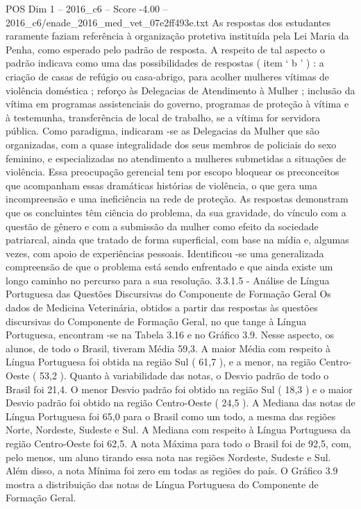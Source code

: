 \begin{textsample}{POS Dim 1 – 2016\_c6 – Score -4.00 – 2016\_c6/enade\_2016\_med\_vet\_07e2ff493e.txt}
As respostas dos estudantes raramente faziam referência à organização protetiva instituída pela Lei Maria da Penha, como esperado pelo padrão de resposta.
A respeito de tal aspecto o padrão indicava como uma das possibilidades de respostas ( item ‘ b ’ ) : a criação de casas de refúgio ou casa-abrigo, para acolher mulheres vítimas de violência doméstica ; reforço às Delegacias de Atendimento à Mulher ; inclusão da vítima em programas assistenciais do governo, programas de proteção à vítima e à testemunha, transferência de local de trabalho, se a vítima for servidora pública.
Como paradigma, indicaram -se as Delegacias da Mulher que são organizadas, com a quase integralidade dos seus membros de policiais do sexo feminino, e especializadas no atendimento a mulheres submetidas a situações de violência.
Essa preocupação gerencial tem por escopo bloquear os preconceitos que acompanham essas dramáticas histórias de violência, o que gera uma incompreensão e uma ineficiência na rede de proteção.
As respostas demonstram que os concluintes têm ciência do problema, da sua gravidade, do vínculo com a questão de gênero e com a submissão da mulher como efeito da sociedade patriarcal, ainda que tratado de forma superficial, com base na mídia e, algumas vezes, com apoio de experiências pessoais.
Identificou -se uma generalizada compreensão de que o problema está sendo enfrentado e que ainda existe um longo caminho no percurso para a sua resolução. 3.3.1.5 - Análise de Língua Portuguesa das Questões Discursivas do Componente de Formação Geral Os dados de Medicina Veterinária, obtidos a partir das respostas às questões discursivas do Componente de Formação Geral, no que tange à Língua Portuguesa, encontram -se na Tabela 3.16 e no Gráfico 3.9.
Nesse aspecto, os alunos, de todo o Brasil, tiveram Média 59,3.
A maior Média com respeito à Língua Portuguesa foi obtida na região Sul ( 61,7 ), e a menor, na região Centro-Oeste ( 53,2 ).
Quanto à variabilidade das notas, o Desvio padrão de todo o Brasil foi 21,4.
O menor Desvio padrão foi obtido na região Sul ( 18,3 ) e o maior Desvio padrão foi obtido na região Centro-Oeste ( 24,5 ).
A Mediana das notas de Língua Portuguesa foi 65,0 para o Brasil como um todo, a mesma das regiões Norte, Nordeste, Sudeste e Sul.
A Mediana com respeito à Língua Portuguesa da região Centro-Oeste foi 62,5.
A nota Máxima para todo o Brasil foi de 92,5, com, pelo menos, um aluno tirando essa nota nas regiões Nordeste, Sudeste e Sul.
Além disso, a nota Mínima foi zero em todas as regiões do país.
O Gráfico 3.9 mostra a distribuição das notas de Língua Portuguesa do Componente de Formação Geral.

\end{textsample}
